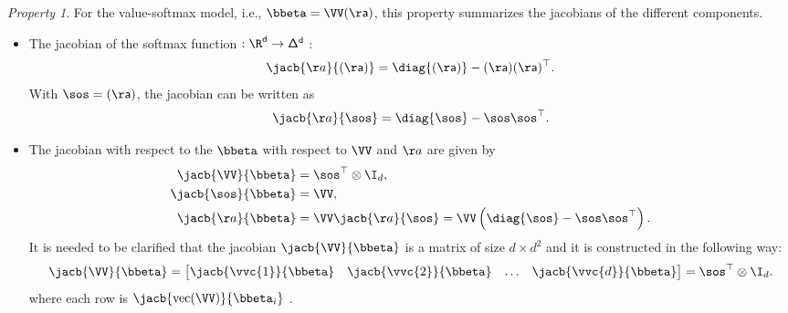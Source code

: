 \documentclass{article}
\theoremstyle{plain}
\theoremstyle{definition}
\theoremstyle{remark}
\newtheorem{property}[theorem]{Property}
\begin{document}
\begin{property} \label{prop:jacobians}
For the value-softmax model, i.e., $\bbeta = \VV \sf(\aa)$, this property summarizes the jacobians of the different components.
    \begin{itemize}
        \item The jacobian of the softmax function $\sf: \R^{d} \to \Delta^{d}$ :
        \begin{align}\label{eq:softmax_jacobian}
            \jacb{\aa}{\sf(\aa)} = \diag{\sf(\aa)} - \sf(\aa) \sf(\aa)^{\top}. 
        \end{align}
        With $\sos = \sf(\aa)$, the jacobian can be written as
        \begin{align}\label{eq:s_jacobian}
            \jacb{\aa}{\sos} = \diag{\sos} - \sos \sos^{\top}. 
        \end{align}
        \item The jacobian with respect to the $\bbeta$ with respect to $\VV$ and $\aa$ are given by
        \begin{align}
            \jacb{\VV}{\bbeta} &= \sos^{\top} \otimes \I_{d}, \\
            \jacb{\sos}{\bbeta} &= \VV, \\
            \jacb{\aa}{\bbeta} &= \VV \jacb{\aa}{\sos} = \VV \left( \diag{\sos} - \sos \sos^{\top} \right).
        \end{align}
        It is needed to be clarified that the jacobian $\jacb{\VV}{\bbeta}$ is a matrix of size $d \times d^2$ and it is constructed in the following way:
        \begin{align*}
            \jacb{\VV}{\bbeta} = \begin{bmatrix}
                \jacb{\vvc{1}}{\bbeta} & \jacb{\vvc{2}}{\bbeta} & \ldots & \jacb{\vvc{d}}{\bbeta}
            \end{bmatrix} = \sos^{\top} \otimes \I_{d}.
        \end{align*}
        where each row is $ \jacb{\mathrm{vec}{(\VV)}}{\bbeta_i} $ . 
    \end{itemize}
\end{property}
\end{document}
